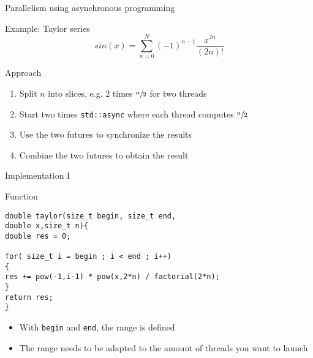 \documentclass[12pt,t]{beamer}
\begin{document}
\begin{frame}{Parallelism using asynchronous programming}

\begin{block}{Example: Taylor series}
$$
sin(x) = \sum\limits_{n=0}^N (-1)^{n-1} \frac{x^{2n}}{(2n)!} 
$$
\end{block}

\begin{block}{Approach}
\begin{enumerate}
\item Split $n$ into slices, e.g. 2 times $\sfrac{n}{2}$ for two threads
\item Start two times \lstinline|std::async| where each thread computes $\sfrac{n}{2}$
\item Use the two futures to synchronize the results
\item Combine the two futures to obtain the result
\end{enumerate}
\end{block}

\end{frame}

\begin{frame}[fragile]{Implementation I}

\begin{block}{Function}
\begin{lstlisting}
double taylor(size_t begin, size_t end, 
double x,size_t n){
double res = 0;

for( size_t i = begin ; i < end ; i++)
{
res += pow(-1,i-1) * pow(x,2*n) / factorial(2*n);
} 
return res;
}

\end{lstlisting}
\end{block}

\begin{itemize}
\item With \lstinline|begin| and \lstinline|end|, the range is defined
\item The range needs to be adapted to the amount of threads you want to launch
\end{itemize}
\end{frame}
\end{document}
